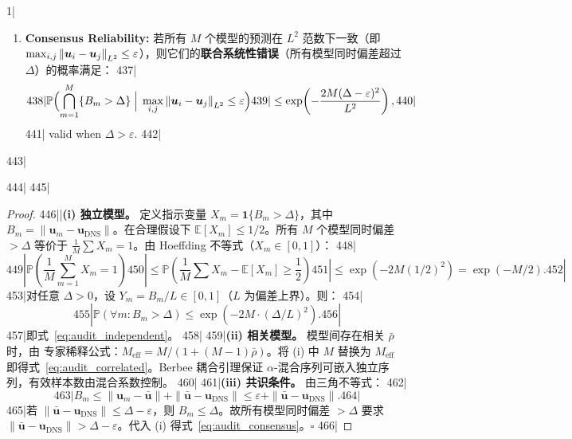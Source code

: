 1|\documentclass[11pt,a4paper]{article}
\begin{document}
\begin{theorem}
\begin{enumerate}[label=(\roman*),leftmargin=*]
\begin{equation}
431|    \mathbb{P}\Bigl(\bigcap_{m=1}^{M} \{B_m > \Delta\}\Bigr)
432|    \leq C_{\alpha} \cdot \exp\!\left(-\frac{2 M_{\text{eff}} \Delta^2}{L^2}\right),
433|  \end{equation}
434|  where $M_{\text{eff}} = M / (1 + 2\sum_{k=1}^{M-1} \alpha(k))$ is the effective independent count.
435|
436|  \item \textbf{Consensus Reliability: } 若所有 $M$ 个模型的预测在 $L^2$ 范数下一致（即 $\max_{i,j} \left\lVert\bm{u}_i - \bm{u}_j\right\rVert_{L^2} \leq \varepsilon$），则它们的\textbf{联合系统性错误}（所有模型同时偏差超过 $\Delta$）的概率满足：
437|  \begin{equation}\label{eq:audit_consensus}
438|    \mathbb{P}\Bigl(\bigcap_{m=1}^{M} \{B_m > \Delta\} \;\Big|\; \max_{i,j}\left\lVert\bm{u}_i - \bm{u}_j\right\rVert_{L^2} \leq \varepsilon\Bigr)
439|    \leq \exp\!\left(-\frac{2M(\Delta - \varepsilon)^2}{L^2}\right),
440|  \end{equation}
441|  valid when $\Delta > \varepsilon$.
442|\end{enumerate}
443|\end{theorem}
444|
445|\begin{proof}
446||\textbf{(i) 独立模型。} 定义指示变量 $X_m = \mathbf{1}\{B_m > \Delta\}$，其中 $B_m = \|\bm{u}_m - \bm{u}_{\text{DNS}}\|$。在合理假设下 $\mathbb{E}[X_m] \leq 1/2$。所有 $M$ 个模型同时偏差 $> \Delta$ 等价于 $\frac{1}{M}\sum X_m = 1$。由 Hoeffding 不等式（$X_m \in [0,1]$）：
448|\[
449|\mathbb{P}\!\left(\frac{1}{M}\sum_{m=1}^M X_m = 1\right)
450|\leq \mathbb{P}\!\left(\frac{1}{M}\sum X_m - \mathbb{E}[X_m] \geq \frac{1}{2}\right)
451|\leq \exp\!\left(-2M(1/2)^2\right) = \exp(-M/2).
452|\]
453|对任意 $\Delta > 0$，设 $Y_m = B_m/L \in [0,1]$（$L$ 为偏差上界）。则：
454|\[
455|\mathbb{P}(\forall m: B_m > \Delta) \leq \exp(-2M \cdot (\Delta/L)^2).
456|\]
457|即式~\eqref{eq:audit_independent}。
458|
459|\textbf{(ii) 相关模型。} 模型间存在相关 $\bar{\rho}$ 时，由 专家稀释公式：$M_{\text{eff}} = M/(1+(M-1)\bar{\rho})$。将 (i) 中 $M$ 替换为 $M_{\text{eff}}$ 即得式~\eqref{eq:audit_correlated}。Berbee 耦合引理保证 $\alpha$-混合序列可嵌入独立序列，有效样本数由混合系数控制。
460|
461|\textbf{(iii) 共识条件。} 由三角不等式：
462|\[
463|B_m \leq \|\bm{u}_m - \bar{\bm{u}}\| + \|\bar{\bm{u}} - \bm{u}_{\text{DNS}}\| \leq \varepsilon + \|\bar{\bm{u}} - \bm{u}_{\text{DNS}}\|.
464|\]
465|若 $\|\bar{\bm{u}} - \bm{u}_{\text{DNS}}\| \leq \Delta - \varepsilon$，则 $B_m \leq \Delta$。故所有模型同时偏差 $> \Delta$ 要求 $\|\bar{\bm{u}} - \bm{u}_{\text{DNS}}\| > \Delta - \varepsilon$。代入 (i) 得式~\eqref{eq:audit_consensus}。$\square$
466|\end{proof}
\end{document}
